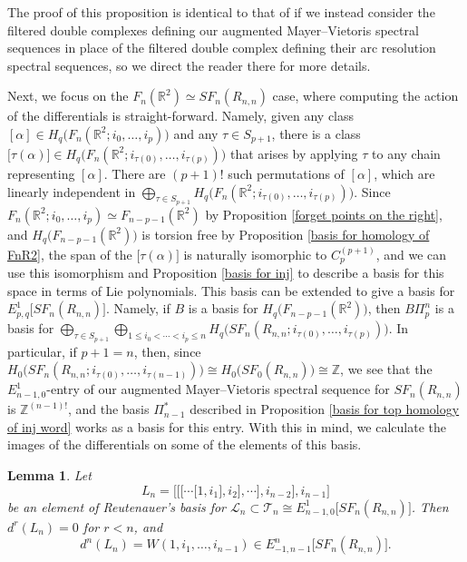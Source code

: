 \documentclass[pagebackref,colorlinks,citecolor=blue,linkcolor=blue,urlcolor=blue,filecolor=blue]{article}
\newtheorem{lem}[thm]{Lemma}
\theoremstyle{definition}\newtheorem{definition}[thm]{Definition}
\theoremstyle{definition}
\newcommand{\Z}{\ensuremath{\mathbb{Z}}}
\newcommand{\R}{\ensuremath{\mathbb{R}}}
\begin{document}
The proof of this proposition is identical to that of \cite[Lemma 3.15]{miller2019higher} if we instead consider the filtered double complexes defining our augmented Mayer--Vietoris spectral sequences in place of the filtered double complex defining their arc resolution spectral sequences, so we direct the reader there for more details.

Next, we focus on the $F_{n}(\R^{2})\simeq SF_{n}(R_{n,n})$ case, where computing the action of the differentials is straight-forward.
Namely, given any class $[\alpha]\in H_{q}\big(F_{n}(\R^{2};  i_{0}, \dots, i_{p})\big)$ and any $\tau\in S_{p+1}$, there is a class $\big[\tau(\alpha)\big]\in H_{q}\big(F_{n}(\R^{2};  i_{\tau(0)}, \dots, i_{\tau(p)})\big)$ that arises by applying $\tau$ to any chain representing $[\alpha]$.
There are $(p+1)!$ such permutations of $[\alpha]$, which are linearly independent in $\bigoplus_{\tau\in S_{p+1}}H_{q}\big(F_{n}(\R^{2};  i_{\tau(0)}, \dots, i_{\tau(p)})\big)$.
Since $F_{n}(\R^{2}; i_{0}, \dots, i_{p})\simeq F_{n-p-1}(\R^{2})$ by Proposition \ref{forget points on the right}, and $H_{q}\big(F_{n-p-1}(\R^{2})\big)$ is torsion free by Proposition \ref{basis for homology of FnR2}, the span of the $\big[\tau(\alpha)\big]$ is naturally isomorphic to $C^{(p+1)}_{p}$, and we can use this isomorphism and Proposition \ref{basis for inj} to describe a basis for this space in terms of Lie polynomials.
This basis can be extended to give a basis for $E^{1}_{p,q}\big[SF_{n}(R_{n,n})\big]$.
Namely, if $B$ is a basis for $H_{q}\big(F_{n-p-1}(\R^{2})\big)$, then $B\Pi^{n}_{p}$ is a basis for $\bigoplus_{\tau\in S_{p+1}}\bigoplus_{1\le i_{0}<\cdots<i_{p}\le n}H_{q}\big(SF_{n}(R_{n,n};  i_{\tau(0)}, \dots, i_{\tau(p)})\big)$.
In particular, if $p+1=n$, then, since $H_{0}\big(SF_{n}(R_{n,n};  i_{\tau(0)}, \dots, i_{\tau(n-1)})\big)\cong H_{0}\big(SF_{0}(R_{n,n})\big) \cong\Z$, we see that the $E^{1}_{n-1, 0}$-entry of our augmented Mayer--Vietoris spectral sequence for $SF_{n}(R_{n,n})$ is $\Z^{(n-1)!}$, and the basis $\Pi^{*}_{n-1}$ described in Proposition \ref{basis for top homology of inj word} works as a basis for this entry.
With this in mind, we calculate the images of the differentials on some of the elements of this basis.

\begin{lem}\label{differentials on Reut}
Let
\[
L_{n}=\Bigg[\bigg[\Big[\cdots\big[1,i_{1}],i_{2}\big],\cdots\Big],i_{n-2}\bigg], i_{n-1}\Bigg]
\]
be an element of Reutenauer's basis for $\mathcal{L}_{n}\subset \mathcal{T}_{n}\cong E^{1}_{n-1, 0}\big[SF_{n}(R_{n,n})\big]$.
Then $d^{r}(L_{n})=0$ for $r<n$, and 
\[
d^{n}(L_{n})=W(1, i_{1},\dots, i_{n-1})\in E^{n}_{-1, n-1}\big[SF_{n}(R_{n,n})\big].
\]
\end{lem}
\end{document}

